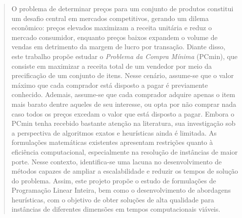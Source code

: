 \begin{abstract}

O problema de determinar preços para um conjunto de produtos constitui um desafio central em mercados competitivos, gerando um dilema econômico: preços elevados maximizam a receita unitária e reduz o mercado consumidor, enquanto preços baixos expandem o volume de vendas em detrimento da margem de lucro por transação. Diante disso, este trabalho propõe estudar o \emph{Problema da Compra Mínima} (PCmin), que consiste em maximizar a receita total de um vendedor por meio da precificação de um conjunto de itens. Nesse cenário, assume-se que o valor máximo que cada comprador está disposto a pagar é previamente conhecido. Ademais, assume-se que cada comprador adquire apenas o item mais barato dentre aqueles de seu interesse, ou opta por não comprar nada caso todos os preços excedam o valor que está disposto a pagar. Embora o PCmin tenha recebido bastante atenção na literatura, sua investigação sob a perspectiva de algoritmos exatos e heurísticas ainda é limitada. As formulações matemáticas existentes apresentam restrições quanto à eficiência computacional, especialmente na resolução de instâncias de maior porte. Nesse contexto, identifica-se uma lacuna no desenvolvimento de métodos capazes de ampliar a escalabilidade e reduzir os tempos de solução do problema. Assim, este projeto propõe o estudo de formulações de Programação Linear Inteira, bem como o desenvolvimento de abordagens heurísticas, com o objetivo de obter soluções de alta qualidade para instâncias de diferentes dimensões em tempos computacionais viáveis.


\end{abstract}

